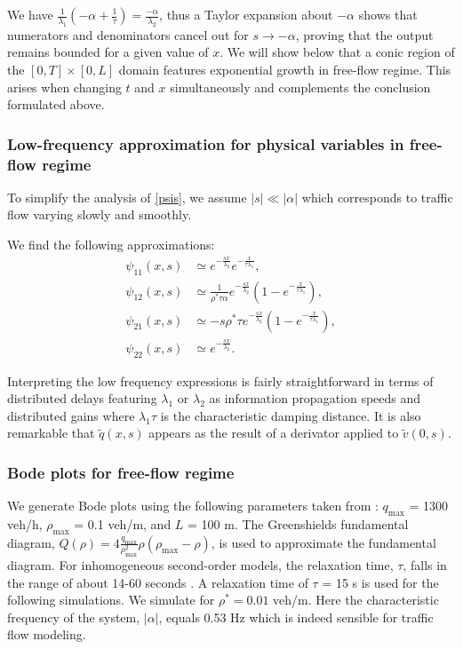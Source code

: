 \documentclass[letterpaper, 10 pt, conference]{ieeeconf}  %
\begin{document}
We have $\frac{1}{\lambda_{1}}\left(-\alpha+\frac{1}{\tau}\right) = \frac{-\alpha}{\lambda_{2}}$, thus a Taylor expansion about $-\alpha$ shows that numerators and denominators cancel out for $s \rightarrow -\alpha$, proving that the output remains bounded for a given value of $x$. We will show below that a conic region of the $\left[0,T\right] \times \left[0,L\right]$ domain features exponential growth in free-flow regime. This arises when changing $t$ and $x$ simultaneously and complements the conclusion formulated above.\\

\subsubsection{Low-frequency approximation for physical variables in free-flow regime}
To simplify the analysis of \eqref{psis}, we assume $\left|s\right|\ll\left|\alpha\right|$ which corresponds to traffic flow varying slowly and smoothly. 

We find the following approximations:
\begin{subequations}
\begin{align}
\psi_{11}(x,s)
&\simeq
e^{-\frac{sx}{\lambda_{2}}}
e^{-\frac{x}{\tau\lambda_{1}}}
, \\
\psi_{12}(x,s)
&\simeq
\frac{
	1
}{
	\rho^{*}\tau\alpha
}
e^{-\frac{sx}{\lambda_{2}}}
\left(
	1 - e^{-\frac{x}{\tau\lambda_{1}}}
\right)
, \\
\psi_{21}(x,s)
& \simeq
- s \rho^{*} \tau
e^{-\frac{sx}{\lambda_{2}}}
\left(
	1 - e^{-\frac{x}{\tau\lambda_{1}}}
\right)
, \\
\psi_{22}(x,s)
&\simeq
e^{-\frac{sx}{\lambda_{2}}}
.
\end{align}
\end{subequations}

Interpreting the low frequency expressions is fairly straightforward in terms of distributed delays featuring $\lambda_1$ or $\lambda_2$ as information propagation speeds and distributed gains where $\lambda_1 \tau$ is the characteristic damping distance. It is also remarkable that $\widetilde{q}(x,s)$ appears as the result of a derivator applied to $\widetilde{v}(0,s)$.

\subsubsection{Bode plots for free-flow regime}
We generate Bode plots using the following parameters taken from \cite{Hofleitner}: $q_{\text{max}}$ = 1300 veh/h, $\rho_{\text{max}}$ = 0.1 veh/m, and $L$ = 100 m. The Greenshields fundamental diagram, $Q( \rho) = 4 \frac{q_{\text{max}}}{\rho_{\text{max}}^2}\rho (\rho_{\text{max}} - \rho)$, is used to approximate the fundamental diagram. For inhomogeneous second-order models, the relaxation time, $\tau$, falls in the range of about 14-60 seconds \cite{Fan}. A relaxation time of $\tau$ = 15 s is used for the following simulations. We simulate for $\rho^* = 0.01$ veh/m. Here the characteristic frequency of the system, $\left|\alpha\right|$, equals 0.53 Hz which is indeed sensible for traffic flow modeling.
\end{document}
